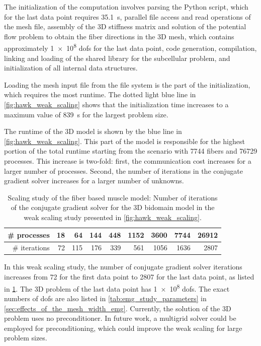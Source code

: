 The initialization of the computation involves parsing the Python script, which for the last data point requires \SI{35.1}{\s}, parallel file access and read operations of the mesh file, assembly of the 3D stiffness matrix and solution of the potential flow problem to obtain the fiber directions in the 3D mesh, which contains approximately \num{1e8} dofs for the last data point, code generation, compilation, linking and loading of the shared library for the subcellular problem, and initialization of all internal data structures.

Loading the mesh input file from the file system is the part of the initialization, which requires the most runtime.
The dotted light blue line in \cref{fig:hawk_weak_scaling} shows that the initialization time increases to a maximum value of \SI{839}{\s} for the largest problem size.

The runtime of the 3D model is shown by the blue line in \cref{fig:hawk_weak_scaling}. This part of the model is responsible for the highest portion of the total runtime starting from the scenario with \num{7744} fibers and \num{76729} processes. This increase is two-fold: first, the communication cost increases for a larger number of processes. Second, the number of iterations in the conjugate gradient solver increases for a larger number of unknowns.

\begin{table}
  \centering%
  \begin{tabular}{|r|r|r|r|r|r|r|r|r|}
    \hline
    \# processes  & 18 & 64  & 144 & 448  & 1152 & 3600 & 7744 & \num{26912}\\\hline
    \# iterations & 72 & 115 & 176 & 339  & 561  & 1056 & 1636 & 2807\\
    \hline
  \end{tabular}
  \caption{Scaling study of the fiber based muscle model: Number of iterations of the conjugate gradient solver for the 3D bidomain model in the weak scaling study presented in \cref{fig:hawk_weak_scaling}.}%
  \label{tab:cg_solver_iterations}%
\end{table}

In this weak scaling study, the number of conjugate gradient solver iterations increases from 72 for the first data point to \num{2807} for the last data point, as listed in \cref{tab:cg_solver_iterations}. The 3D problem of the last data point has \num{1e8} dofs. The exact numbers of dofs are also listed in \cref{tab:emg_study_parameters} in \cref{sec:effects_of_the_mesh_width_emg}.
Currently, the solution of the 3D problem uses no preconditioner. In future work, a multigrid solver could be employed for preconditioning, which could improve the weak scaling for large problem sizes.

